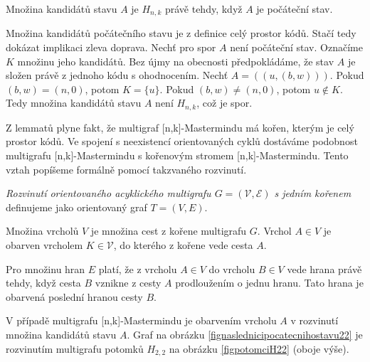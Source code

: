 \begin{lemma}\label{lemmakandidatipocstavu}
    Množina kandidátů stavu $A$ je $H_{n,k}$ právě tehdy, když $A$ je počáteční stav.
\end{lemma}
\begin{dukaz}
    Množina kandidátů počátečního stavu je z definice celý prostor kódů. Stačí tedy dokázat implikaci zleva doprava. Nechť pro spor $A$ není počáteční stav. Označíme $K$ množinu jeho kandidátů. Bez újmy na obecnosti předpokládáme, že stav $A$ je složen právě z jednoho kódu s ohodnocením. Nechť $A = ((u, (b,w)))$. Pokud $(b,w) = (n,0)$, potom $K = \{u\}$. Pokud $(b,w) \neq (n,0)$, potom $u \notin K$. Tedy množina kandidátů stavu $A$ není $H_{n,k}$, což je spor. 
\end{dukaz}

Z lemmatů plyne fakt, že multigraf [n,k]-Mastermindu má kořen, kterým je celý prostor kódů. Ve spojení s neexistencí orientovaných cyklů dostáváme podobnost multigrafu [n,k]-Mastermindu s kořenovým stromem [n,k]-Mastermindu. Tento vztah popíšeme formálně pomocí takzvaného rozvinutí.
\begin{definice}
    \emph{Rozvinutí orientovaného acyklického multigrafu $G = (\mathcal{V}, \mathcal{E})$ s jedním kořenem} definujeme jako orientovaný graf $T = (V, E)$.
    
    Množina vrcholů $V$ je množina cest z kořene multigrafu $G$. Vrchol $A \in V$ je obarven vrcholem $K \in \mathcal{V}$, do kterého z kořene vede cesta $A$. 
    
    Pro množinu hran $E$ platí, že z vrcholu $A \in V$ do vrcholu $B \in V$ vede hrana právě tehdy, když cesta $B$ vznikne z cesty $A$ prodloužením o jednu hranu. Tato hrana je obarvená poslední hranou cesty $B$. 
\end{definice}
V případě multigrafu [n,k]-Mastermindu je obarvením vrcholu $A$ v rozvinutí množina kandidátů stavu $A$. Graf na obrázku \ref{fignaslednicipocatecnihostavu22} je rozvinutím multigrafu potomků $H_{2,2}$ na obrázku \ref{figpotomciH22} (oboje výše).


